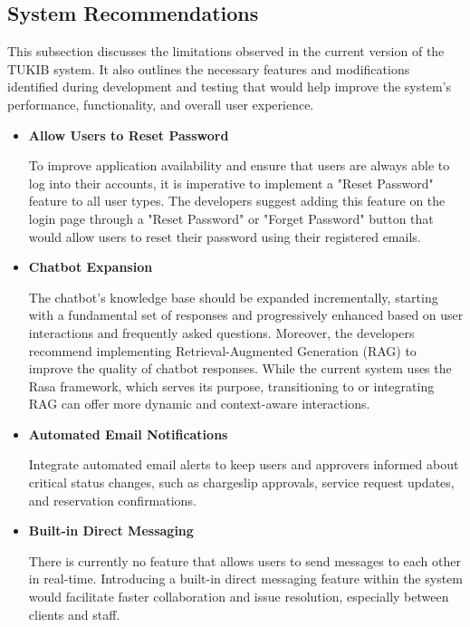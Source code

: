 \subsection{System Recommendations}

This subsection discusses the limitations observed in the current version of the TUKIB system. It also outlines the necessary features and modifications identified during development and testing that would help improve the system’s performance, functionality, and overall user experience.

\begin{itemize}
	
	\item \textbf{Allow Users to Reset Password}
	
	To improve application availability and ensure that users are always able to log into their accounts, it is imperative to implement a "Reset Password" feature to all user types. The developers suggest adding this feature on the login page through a "Reset Password" or "Forget Password" button that would allow users to reset their password using their registered emails.
	
	\item \textbf{Chatbot Expansion}
	
	The chatbot's knowledge base should be expanded incrementally, starting with a fundamental set of responses and progressively enhanced based on user interactions and frequently asked questions. Moreover, the developers recommend implementing Retrieval-Augmented Generation (RAG) to improve the quality of chatbot responses. While the current system uses the Rasa framework, which serves its purpose, transitioning to or integrating RAG can offer more dynamic and context-aware interactions.
	
	\item \textbf{Automated Email Notifications}
	
	Integrate automated email alerts to keep users and approvers informed about critical status changes, such as chargeslip approvals, service request updates, and reservation confirmations.
	
	\item \textbf{Built-in Direct Messaging}
	
	There is currently no feature that allows users to send messages to each other in real-time. Introducing a built-in direct messaging feature within the system would facilitate faster collaboration and issue resolution, especially between clients and staff.
	

\end{itemize}
